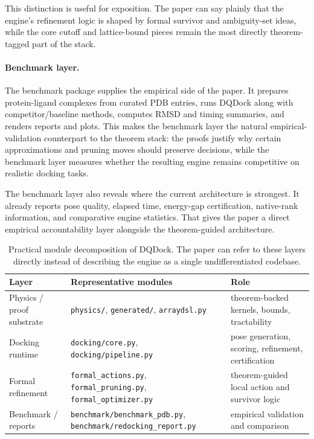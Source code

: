 This distinction is useful for exposition. The paper can say plainly that the engine's refinement logic is shaped by formal survivor and ambiguity-set ideas, while the core cutoff and lattice-bound pieces remain the most directly theorem-tagged part of the stack.

\paragraph{Benchmark layer.}
The benchmark package supplies the empirical side of the paper. It prepares protein-ligand complexes from curated PDB entries, runs DQDock along with competitor/baseline methods, computes RMSD and timing summaries, and renders reports and plots. This makes the benchmark layer the natural empirical-validation counterpart to the theorem stack: the proofs justify why certain approximations and pruning moves should preserve decisions, while the benchmark layer measures whether the resulting engine remains competitive on realistic docking tasks.

The benchmark layer also reveals where the current architecture is strongest. It already reports pose quality, elapsed time, energy-gap certification, native-rank information, and comparative engine statistics. That gives the paper a direct empirical accountability layer alongside the theorem-guided architecture.

\begin{table}[t]
\centering
\small
\begin{tabular}{@{}lll@{}}
\toprule
\textbf{Layer} & \textbf{Representative modules} & \textbf{Role} \\
\midrule
Physics / proof substrate & \texttt{physics/}, \texttt{generated/}, \texttt{arraydsl.py} & theorem-backed kernels, bounds, tractability \\
Docking runtime & \texttt{docking/core.py}, \texttt{docking/pipeline.py} & pose generation, scoring, refinement, certification \\
Formal refinement & \texttt{formal\_actions.py}, \texttt{formal\_pruning.py}, \texttt{formal\_optimizer.py} & theorem-guided local action and survivor logic \\
Benchmark / reports & \texttt{benchmark/benchmark\_pdb.py}, \texttt{benchmark/redocking\_report.py} & empirical validation and comparison \\
\bottomrule
\end{tabular}
\caption{Practical module decomposition of DQDock. The paper can refer to these layers directly instead of describing the engine as a single undifferentiated codebase.}
\end{table}

